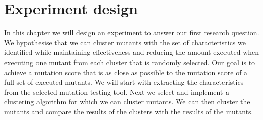 \documentclass[../main]{subfiles}
\begin{document}
\clearpage
\section{Experiment design}
In this chapter we will design an experiment to answer our first research question.
We hypothesise that we can cluster mutants with the set of characteristics we identified
while maintaining effectiveness and reducing the amount executed when executing one mutant from each cluster that is randomly selected.
Our goal is to achieve a mutation score that is as close as possible to the mutation score of a full set of executed mutants.
\newline
We will start with extracting the characteristics from the selected mutation testing tool. 
Next we select and implement a clustering algorithm for which we can cluster mutants.
We can then cluster the mutants and compare the results of the clusters with the results of the mutants. 
\end{document}
